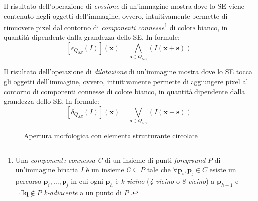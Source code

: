 Il risultato dell'operazione di \textit{erosione} di un'immagine mostra dove lo SE viene contenuto negli oggetti dell'immagine, ovvero, intuitivamente permette di rimuovere pixel dal contorno di \textit{componenti connesse}\footnote{Una \textit{componente connessa} \textit{C} di un insieme di punti \textit{foreground} $P$ di un'immagine binaria $I$ \`e un insieme $C\subseteq P$ tale che $\forall \textbf{p}_{i}, \textbf{p}_{j} \in C$ esiste un percorso $\textbf{p}_{i}, \dots, \textbf{p}_{j}$ in cui ogni $\textbf{p}_{h}$ \`e \textit{k-vicino} (\textit{4-vicino} o \textit{8-vicino}) a $\textbf{p}_{h-1}$ e $\neg \exists \textbf{q}\notin P$ \textit{k-adiacente} a un punto di $P$ \cite{bib:binary-images-connectivity}.} di colore bianco, in quantit\`a dipendente dalla grandezza dello SE. In formule:
\begin{equation}
	\label{eq:erosion}
	[\epsilon_{Q_{SE}}(I)](\textbf{x}) = \underset{\textbf{s}\in Q_{SE}}{\bigwedge}(I(\textbf{x}+\textbf{s}))
\end{equation}\par
Il risultato dell'operazione di \textit{dilatazione} di un'immagine mostra dove lo SE tocca gli oggetti dell'immagine, ovvero, intuitivamente permette di aggiungere pixel al contorno di componenti connesse di colore bianco, in quantit\`a dipendente dalla grandezza dello SE. In formule:
\begin{equation}
	\label{eq:dilation}
	[\delta_{Q_{SE}}(I)](\textbf{x}) = \underset{\textbf{s}\in Q_{SE}}{\bigvee}(I(\textbf{x}+\textbf{s}))
\end{equation}

\begin{figure}[t]
	\centering
	\caption{Apertura morfologica con elemento strutturante circolare} \label{fig:opening}
\end{figure}

